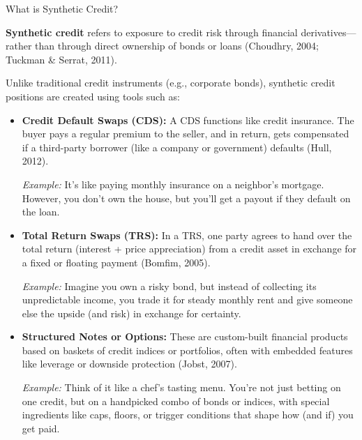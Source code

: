 \begin{TechnicalSidebar}{What is Synthetic Credit?}

    \textbf{Synthetic credit} refers to exposure to credit risk through financial derivatives—rather 
    than through direct ownership of bonds or loans (Choudhry, 2004; Tuckman \& Serrat, 2011).
  
    \medskip
    
    Unlike traditional credit instruments (e.g., corporate bonds), synthetic credit positions are 
    created using tools such as:
  
    \medskip
  
    \begin{itemize}
      \item \textbf{Credit Default Swaps (CDS):}  
      A CDS functions like credit insurance. The buyer pays a regular premium to the seller, and in 
      return, gets compensated if a third-party borrower (like a company or government) defaults 
      (Hull, 2012).  
  
      \medskip
    
      \textit{Example:} It's like paying monthly insurance on a neighbor’s mortgage. However, you don’t 
      own the house, but you’ll get a payout if they default on the loan.
  
      \medskip
  
      \item \textbf{Total Return Swaps (TRS):}  
      In a TRS, one party agrees to hand over the total return (interest + price appreciation) from a 
      credit asset in exchange for a fixed or floating payment (Bomfim, 2005).
  
      \medskip
  
      \textit{Example:} Imagine you own a risky bond, but instead of collecting its unpredictable income, 
      you trade it for steady monthly rent and give someone else the upside (and risk) in exchange for 
      certainty.
  
      \medskip
  
      \item \textbf{Structured Notes or Options:}  
      These are custom-built financial products based on baskets of credit indices or portfolios, often 
      with embedded features like leverage or downside protection (Jobst, 2007).
  
      \medskip
  
      \textit{Example:} Think of it like a chef's tasting menu. You're not just betting on one credit, 
      but on a handpicked combo of bonds or indices, with special ingredients like caps, floors, or 
      trigger conditions that shape how (and if) you get paid.
    \end{itemize}
  

\end{TechnicalSidebar}
